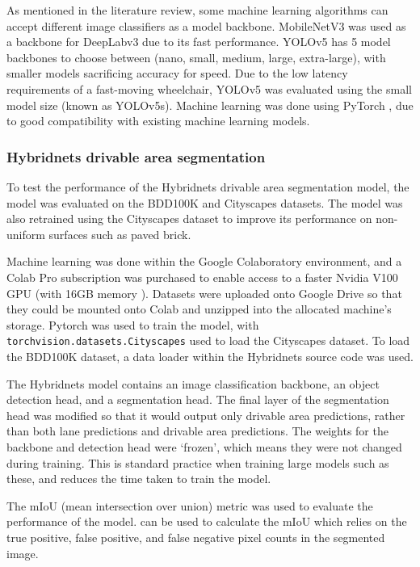 As mentioned in the literature review, some machine learning algorithms can accept
different image classifiers as a model backbone.
MobileNetV3 \cite{howardSearchingMobileNetV32019} was used as a backbone for DeepLabv3 due to its fast performance.
YOLOv5 has 5 model backbones to choose between (nano, small, medium, large, extra-large),
with smaller models sacrificing accuracy for speed. Due to the low latency requirements
of a fast-moving wheelchair, YOLOv5 was evaluated using the small model size (known as YOLOv5s).
Machine learning was done using PyTorch \cite{paszkePyTorchImperativeStyle2019}, due to good compatibility
with existing machine learning models.

\subsubsection{Hybridnets drivable area segmentation}
To test the performance of the Hybridnets drivable area segmentation model,
the model was evaluated on the BDD100K and Cityscapes \cite{cordtsCityscapesDatasetSemantic2016}
datasets. The model was also retrained using the Cityscapes dataset
to improve its performance on non-uniform surfaces such as paved brick.

Machine learning was done within the Google Colaboratory environment,
and a Colab Pro subscription was purchased to enable access to
a faster Nvidia V100 GPU (with 16GB memory \cite{nvidiaNvidiaTeslaV1002018}).
Datasets were uploaded onto Google Drive so that they could be mounted onto Colab
and unzipped into the allocated machine's storage. Pytorch was used to train
the model, with \texttt{torchvision.datasets.Cityscapes} used to load the Cityscapes
dataset. To load the BDD100K dataset, a data loader within the Hybridnets source code
was used.

The Hybridnets model contains an image classification backbone, an object
detection head, and a segmentation head. The final layer of the segmentation head
was modified so that it would output only drivable area predictions, rather
than both lane predictions and drivable area predictions.
The weights for the backbone and detection head were `frozen', which means
they were not changed during training. This is standard practice when training
large models such as these, and reduces the time taken to train the model.

The mIoU (mean intersection over union) metric was used to evaluate the
performance of the model.  can be used to calculate the mIoU
which relies on the true positive, false positive, and false negative
pixel counts in the segmented image.

